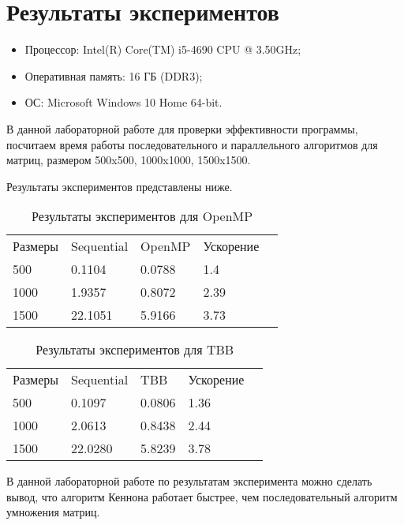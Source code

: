 \documentclass{report}
\begin{document}
\section*{Результаты экспериментов}
\begin{itemize}
\item Процессор: Intel(R) Core(TM) i5-4690 CPU @ 3.50GHz;
\item Оперативная память: 16 ГБ (DDR3);
\item ОС: Microsoft Windows 10 Home 64-bit.
\end{itemize}
\par В данной лабораторной работе для проверки эффективности программы, посчитаем время работы последовательного и параллельного алгоритмов для матриц, размером 500x500, 1000x1000, 1500x1500.
\par Результаты экспериментов представлены ниже.

\begin{table}[!h]
\caption{Результаты экспериментов для OpenMP}
\centering
\begin{tabular}{lllll}
Размеры & Sequential & OpenMP   & Ускорение  \\
500     & 0.1104     & 0.0788   & 1.4       \\
1000    & 1.9357    & 0.8072  & 2.39       \\
1500    & 22.1051   & 5.9166  & 3.73       \\
\end{tabular}
\end{table}

\begin{table}[!h]
\caption{Результаты экспериментов для TBB}
\centering
\begin{tabular}{lllll}
Размеры  & Sequential & TBB       & Ускорение     \\
500      & 0.1097     & 0.0806    & 1.36          \\
1000     & 2.0613     & 0.8438    & 2.44       \\
1500     & 22.0280     & 5.8239    & 3.78       \\
\end{tabular}
\end{table}

\par В данной лабораторной работе по результатам эксперимента можно сделать вывод, что алгоритм Кеннона работает быстрее, чем последовательный алгоритм умножения матриц. 
\newpage
\end{document}
